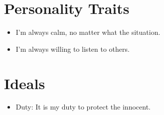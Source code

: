 \documentclass{article}
\begin{document}
\section{Personality Traits}
\begin{itemize}
\item I'm always calm, no matter what the situation.
\item I'm always willing to listen to others.
\end{itemize}

\section{Ideals}
\begin{itemize}
\item Duty: It is my duty to protect the innocent.
\end{itemize}
\end{document}
